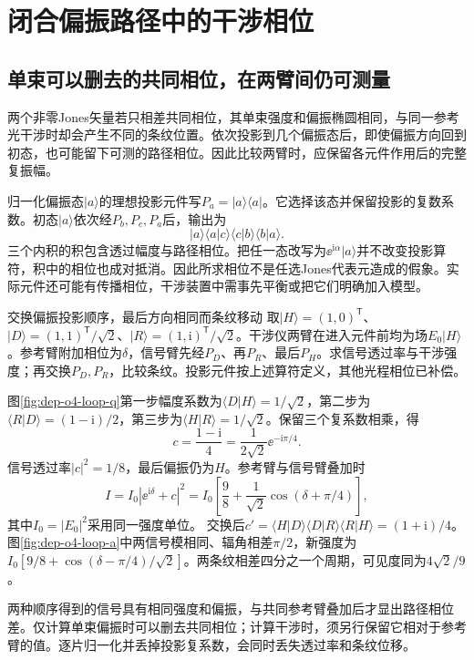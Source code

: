 \section{闭合偏振路径中的干涉相位}
\subsection{单束可以删去的共同相位，在两臂间仍可测量}
两个非零Jones矢量若只相差共同相位，其单束强度和偏振椭圆相同，与同一参考光干涉时却会产生不同的条纹位置。依次投影到几个偏振态后，即使偏振方向回到初态，也可能留下可测的路径相位。因此比较两臂时，应保留各元件作用后的完整复振幅。

归一化偏振态$|a\rangle$的理想投影元件写$P_a=|a\rangle\langle a|$。它选择该态并保留投影的复数系数。初态$|a\rangle$依次经$P_b,P_c,P_a$后，输出为
\[
 |a\rangle\langle a|c\rangle\langle c|b\rangle\langle b|a\rangle.
\]
三个内积的积包含透过幅度与路径相位。把任一态改写为$\ee^{\mathrm i\alpha}|a\rangle$并不改变投影算符，积中的相位也成对抵消。因此所求相位不是任选Jones代表元造成的假象。实际元件还可能有传播相位，干涉装置中需事先平衡或把它们明确加入模型。

\begin{example}交换偏振投影顺序，最后方向相同而条纹移动
取$|H\rangle=(1,0)^{\mathsf T}$、$|D\rangle=(1,1)^{\mathsf T}/\sqrt2$、$|R\rangle=(1,\mathrm i)^{\mathsf T}/\sqrt2$。干涉仪两臂在进入元件前均为场$E_0|H\rangle$。参考臂附加相位为$\delta$，信号臂先经$P_D$、再$P_R$、最后$P_H$。求信号透过率与干涉强度；再交换$P_D,P_R$，比较条纹。投影元件按上述算符定义，其他光程相位已补偿。
\end{example}
\begin{solution}
图\ref{fig:dep-o4-loop-q}第一步幅度系数为$\langle D|H\rangle=1/\sqrt2$，第二步为$\langle R|D\rangle=(1-\mathrm i)/2$，第三步为$\langle H|R\rangle=1/\sqrt2$。保留三个复系数相乘，得
\[
 c=\frac{1-\mathrm i}{4}=\frac1{2\sqrt2}\ee^{-\mathrm i\pi/4}.
\]
信号透过率$|c|^2=1/8$，最后偏振仍为$H$。参考臂与信号臂叠加时
\[
 I=I_0|\ee^{\mathrm i\delta}+c|^2
 =I_0\left[\frac98+\frac1{\sqrt2}\cos(\delta+\pi/4)\right],
\]
其中$I_0=|E_0|^2$采用同一强度单位。
交换后$c'=\langle H|D\rangle\langle D|R\rangle\langle R|H\rangle=(1+\mathrm i)/4$。图\ref{fig:dep-o4-loop-a}中两信号模相同、辐角相差$\pi/2$，新强度为$I_0[9/8+\cos(\delta-\pi/4)/\sqrt2]$。两条纹相差四分之一个周期，可见度同为$4\sqrt2/9$。

两种顺序得到的信号具有相同强度和偏振，与共同参考臂叠加后才显出路径相位差。仅计算单束偏振时可以删去共同相位；计算干涉时，须另行保留它相对于参考臂的值。逐片归一化并丢掉投影复系数，会同时丢失透过率和条纹位移。
\end{solution}
